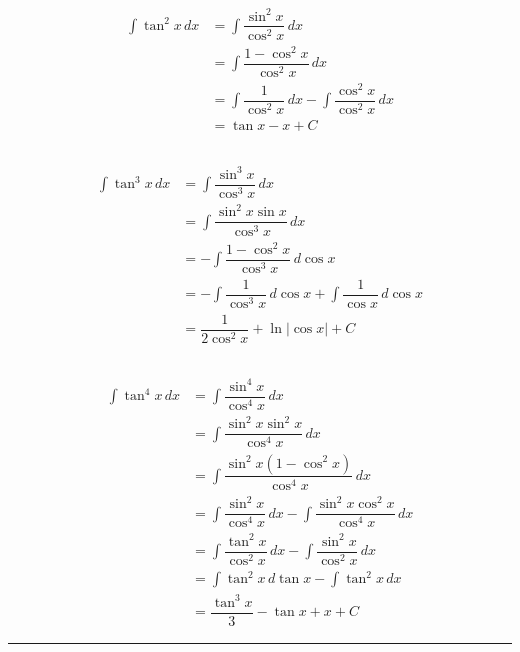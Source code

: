 \documentclass{scrartcl}
\begin{document}
\begin{align*}
\displaystyle \int \tan^2{x}\,dx
&= \int \dfrac{\sin^2{x}}{\cos^2{x}} \,dx\\
&= \int \dfrac{1-\cos^2{x}}{\cos^2{x}} \,dx\\
&= \int \dfrac{1}{\cos^2{x}} \,dx - \int \dfrac{\cos^2{x}}{\cos^2{x}} \,dx\\
&= \tan{x} - x + C
\end{align*}

\subsection{}

\begin{align*}
\displaystyle \int \tan^3{x}\,dx
&= \int \dfrac{\sin^3{x}}{\cos^3{x}} \,dx\\
&= \int \dfrac{\sin^2{x}\sin{x}}{\cos^3{x}} \,dx\\
&= -\int \dfrac{1-\cos^2{x}}{\cos^3{x}} \,d\cos{x}\\
&= -\int \dfrac{1}{\cos^3{x}} \,d\cos{x} + \int \dfrac{1}{\cos{x}} \,d\cos{x}\\
&= \dfrac{1}{2\cos^2{x}} + \ln{|\cos{x}|} + C
\end{align*}

\subsection{}

\begin{align*}
\displaystyle \int \tan^4{x}\,dx
&= \int \dfrac{\sin^4{x}}{\cos^4{x}} \,dx\\
&= \int \dfrac{\sin^2{x}\sin^2{x}}{\cos^4{x}} \,dx\\
&= \int \dfrac{\sin^2{x}(1-\cos^2{x})}{\cos^4{x}} \,dx\\
&= \int \dfrac{\sin^2{x}}{\cos^4{x}} \,dx - \int \dfrac{\sin^2{x}\cos^2{x}}{\cos^4{x}} \,dx\\
&= \int \dfrac{\tan^2{x}}{\cos^2{x}} \,dx - \int \dfrac{\sin^2{x}}{\cos^2{x}} \,dx\\
&= \int \tan^2{x} \,d\tan{x} - \int \tan^2{x} \,dx\\
&= \dfrac{\tan^3{x}}{3} - \tan{x} + x + C
\end{align*}

\hrule
\end{document}
